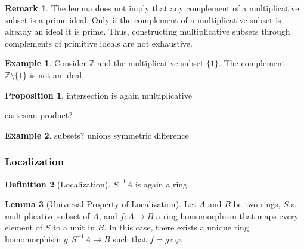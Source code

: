 \documentclass[a4paper]{book}
\theoremstyle{definition}
\newtheorem{definition}{Definition}[]
\newtheorem{example}{Example}[definition]
\newtheorem{lemma}[definition]{Lemma}
\newtheorem{proposition}[definition]{Proposition}
\newtheorem*{remark}{Remark}
\begin{document}
\begin{rembox}
    \begin{remark}
        The lemma does not imply that any complement of a multiplicative subset is a prime ideal. Only if the complement of a multiplicative subset is already an ideal it is prime. Thus, constructing multiplicative subsets through complements of primitive ideals are not exhaustive.
    \end{remark}
\end{rembox}
\begin{exmbox}
    \begin{example}
        Consider \(\mathbb{Z}\) and the multiplicative subset \(\{1\}\). The complement \(\mathbb{Z} \setminus \{1\}\) is not an ideal.
    \end{example}
\end{exmbox}

\begin{thmbox}
    \begin{proposition}
        intersection is again multiplicative

        cartesian product?
    \end{proposition}
\end{thmbox}
\begin{exmbox}
    \begin{example}
        subsets?
        unions
        symmetric difference
    \end{example}
\end{exmbox}

\subsubsection{Localization}
\begin{defbox}
    \begin{definition}[Localization]
        \(S^{-1}A\) is again a ring.
    \end{definition}
\end{defbox}

\begin{thmbox}
    \begin{lemma}[Universal Property of Localization]
        Let \(A\) and \(B\) be two rings, \(S\) a multiplicative subset of \(A\), and \(f: A \rightarrow B\) a ring homomorphism that maps every element of \(S\) to a unit in \(B\). In this case, there exists a unique ring homomorphism \(g: S^{-1}A \rightarrow B\) such that \(f = g \circ \varphi\).
    \end{lemma}
\end{thmbox}
\end{document}
